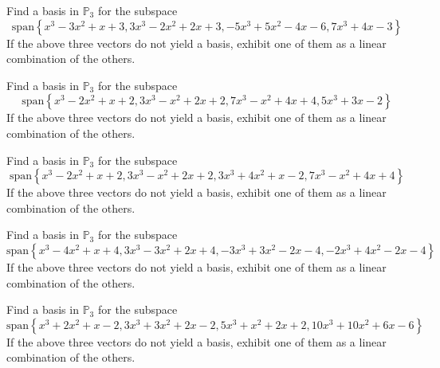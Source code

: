 \documentclass{ximera}
\begin{document}
\begin{problem}\label{prb:10.38} Find a basis in $\mathbb{P}_{3}$ for the subspace
\begin{equation*}
\mbox{span}\left\{
x^{3}-3x^{2}+x+3,3x^{3}-2x^{2}+2x+3,-5x^{3}+5x^{2}-4x-6,7x^{3}+4x-3\right\}
\end{equation*}
If the above three vectors do not yield a basis, exhibit one
of them as a linear combination of the others.
\end{problem}


\begin{problem}\label{prb:10.39} Find a basis in $\mathbb{P}_{3}$ for the subspace
\begin{equation*}
\mbox{span}\left\{
x^{3}-2x^{2}+x+2,3x^{3}-x^{2}+2x+2,7x^{3}-x^{2}+4x+4,5x^{3}+3x-2\right\}
\end{equation*}
If the above three vectors do not yield a basis, exhibit one
of them as a linear combination of the others.
\end{problem}


\begin{problem}\label{prb:10.40} Find a basis in $\mathbb{P}_{3}$ for the subspace
\begin{equation*}
\mbox{span}\left\{
x^{3}-2x^{2}+x+2,3x^{3}-x^{2}+2x+2,3x^{3}+4x^{2}+x-2,7x^{3}-x^{2}+4x+4\right
\}
\end{equation*}
If the above three vectors do not yield a basis, exhibit one
of them as a linear combination of the others.
\end{problem}


\begin{problem}\label{prb:10.41} Find a basis in $\mathbb{P}_{3}$ for the subspace
\begin{equation*}
\mbox{span}\left\{
x^{3}-4x^{2}+x+4,3x^{3}-3x^{2}+2x+4,-3x^{3}+3x^{2}-2x-4,-2x^{3}+4x^{2}-2x-4
\right\}
\end{equation*}
If the above three vectors do not yield a basis, exhibit one
of them as a linear combination of the others.
\end{problem}


\begin{problem}\label{prb:10.42} Find a basis in $\mathbb{P}_{3}$ for the subspace
\begin{equation*}
\mbox{span}\left\{
x^{3}+2x^{2}+x-2,3x^{3}+3x^{2}+2x-2,5x^{3}+x^{2}+2x+2,10x^{3}+10x^{2}+6x-6
\right\}
\end{equation*}
If the above three vectors do not yield a basis, exhibit one
of them as a linear combination of the others.
\end{problem}
\end{document}
